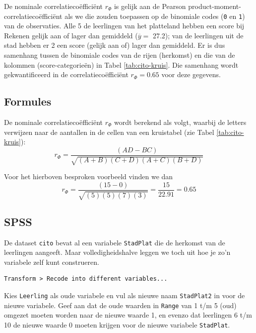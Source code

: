 \documentclass[
]{book}
\begin{document}
De nominale correlatiecoëfficiënt \(r_\Phi\) is gelijk aan de Pearson
product-moment-correlatiecoëfficiënt als we die zouden toepassen op de binomiale codes
(\texttt{0} en \texttt{1}) van de observaties. Alle 5 de leerlingen van het platteland
hebben een score bij Rekenen gelijk aan of lager dan gemiddeld
(\(\overline{y}=\) 27.2); van de leerlingen uit de stad hebben er 2 een score
(gelijk aan of) lager dan gemiddeld. Er is dus samenhang tussen de
binomiale codes van de rijen (herkomst) en die van de kolommen
(score-categorieën) in Tabel \ref{tab:cito-kruis}.
Die samenhang wordt gekwantificeerd in de
correlatiecoëfficiënt \(r_\Phi=0.65\) voor deze gegevens.

\hypertarget{formules-5}{%
\subsection{Formules}\label{formules-5}}

De nominale correlatiecoëfficiënt \(r_\Phi\) wordt berekend als volgt,
waarbij de letters verwijzen naar de aantallen in de cellen van een
kruistabel (zie Tabel \ref{tab:cito-kruis}):
\begin{equation}
    r_\Phi = \frac{(AD-BC)}{\sqrt{(A+B)(C+D)(A+C)(B+D)}}
  \label{eq:phi}
\end{equation}

Voor het hierboven besproken voorbeeld vinden we dan
\[
    r_\Phi = \frac{(15-0)}{\sqrt{(5)(5)(7)(3)}} = \frac{15}{22.91} = 0.65
\]

\hypertarget{spss-8}{%
\subsection{SPSS}\label{spss-8}}

De dataset \texttt{cito} bevat al een variabele \texttt{StadPlat} die de herkomst van de leerlingen aangeeft. Maar volledigheidshalve leggen we toch uit hoe je zo'n variabele zelf kunt construeren.

\begin{verbatim}
Transform > Recode into different variables...
\end{verbatim}

Kies \texttt{Leerling} als oude variabele en vul als nieuwe naam \texttt{StadPlat2}
in voor de nieuwe variabele. Geef aan dat de oude waarden in \texttt{Range} van
1 t/m 5 (oud) omgezet moeten worden naar de nieuwe waarde 1, en evenzo
dat leerlingen 6 t/m 10 de nieuwe waarde 0 moeten krijgen voor de nieuwe
variabele \texttt{StadPlat}.
\end{document}
